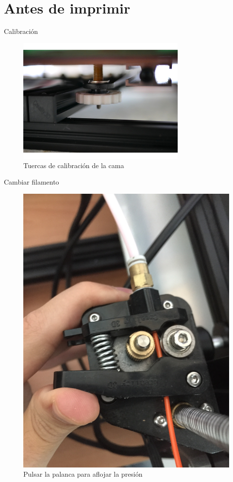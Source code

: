 \documentclass{beamer}
\begin{document}
	\section{Antes de imprimir}
	\begin{frame}{Calibración}
		\begin{figure}
			\includegraphics[width=0.75\textwidth]{images/bed_knob}
			\caption{Tuercas de calibración de la cama}
		\end{figure}
	\end{frame}
	\begin{frame}{Cambiar filamento}
		\begin{figure}
			\includegraphics[width=.75\textwidth]{images/cambiar_filamento}
			\caption{Pulsar la palanca para aflojar la presión}
		\end{figure}
	\end{frame}
\end{document}
